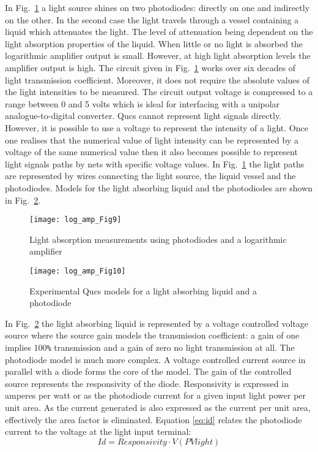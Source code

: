 In Fig.~\ref{fig:log_amp9} a light source shines on two photodiodes:
directly on one and indirectly on the other. In the second case the
light travels through a vessel containing a liquid which attenuates
the light. The level of attenuation being dependent on the light
absorption properties of the liquid.  When little or no light is
absorbed the logarithmic amplifier output is small. However, at high
light absorption levels the amplifier output is high. The circuit
given in Fig.~\ref{fig:log_amp9} works over six decades of light
transmission coefficient. Moreover, it does not require the absolute
values of the light intensities to be measured. The circuit output
voltage is compressed to a range between 0 and 5 volts which is ideal
for interfacing with a unipolar analogue-to-digital converter. Qucs
cannot represent light signals directly. However, it is possible to
use a voltage to represent the intensity of a light. Once one realises
that the numerical value of light intensity can be represented by a
voltage of the same numerical value then it also becomes possible to
represent light signals paths by nets with specific voltage values.
In Fig.~\ref{fig:log_amp9} the light paths are represented by wires
connecting the light source, the liquid vessel and the
photodiodes. Models for the light absorbing liquid and the photodiodes
are shown in Fig.~\ref{fig:log_amp10}.


 \begin{figure} [h]
  \centering
  \texttt{[image: log\_amp\_Fig9]}
  \caption{Light absorption measurements using photodiodes and a logarithmic amplifier}
  \label{fig:log_amp9}
\end{figure}   


 \begin{figure} [h]
  \centering
  \texttt{[image: log\_amp\_Fig10]}
  \caption{Experimental Qucs models for a light absorbing liquid and a photodiode}
  \label{fig:log_amp10}
\end{figure}

In Fig.~\ref{fig:log_amp10} the light absorbing liquid is represented
by a voltage controlled voltage source where the source gain models
the transmission coefficient: a gain of one implies 100\verb|%|
transmission and a gain of zero no light transmission at all. The
photodiode model is much more complex.  A voltage controlled current
source in parallel with a diode forms the core of the model.  The gain
of the controlled source represents the responsivity of the
diode. Responsivity is expressed in amperes per watt or as the
photodiode current for a given input light power per unit area. As the
current generated is also expressed as the current per unit area,
effectively the area factor is eliminated.  Equation \eqref{eq:id}
relates the photodiode current to the voltage at the light input
terminal:
\begin{equation}
\label{eq:id}
Id=Responsivity\cdot V(PVlight)
\end{equation}

